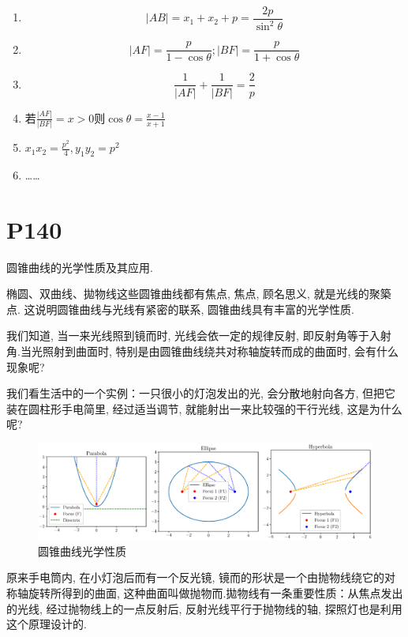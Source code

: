 \documentclass{book}
\begin{document}
    \begin{enumerate}
        \item $$\left| AB \right|=x_1+x_2+p=\frac{2p}{\sin^2\theta}$$
        \item $$\left| AF \right|=\frac{p}{1-\cos \theta};\left| BF \right|=\frac{p}{1+\cos \theta}$$
        \item $$\frac{1}{\left| AF \right|}+\frac{1}{\left| BF \right|}=\frac{2}{p}$$
        \item 若$\displaystyle \frac{\left| AF \right|}{\left| BF \right|}=x>0$则$\displaystyle \cos \theta = \frac{x-1}{x+1}$
        \item $\displaystyle x_1x_2=\frac{p^2}{4},y_1y_2=p^2$
        \item \dots\dots
    \end{enumerate}

    \section{\textcolor[rgb]{0.11,0.65,0.52}{P140}}

    圆锥曲线的光学性质及其应用.

    椭圆、双曲线、拋物线这些圆锥曲线都有焦点, 焦点, 顾名思义, 就是光线的聚築点. 这说明圆锥曲线与光线有紧密的联系, 圆锥曲线具有丰富的光学性质.

    我们知道, 当一来光线照到镜而时, 光线会依一定的规律反射, 即反射角等于入射角.当光照射到曲面时, 特别是由圆锥曲线绕共对称轴旋转而成的曲面时, 会有什么现象呢?

    我们看生活中的一个实例：一只很小的灯泡发出的光, 会分散地射向各方, 但把它装在圆柱形手电简里, 经过适当调节, 就能射出一来比较强的干行光线, 这是为什么呢?

    \begin{figure}[htbp]
        \centering
        \includegraphics[width=\textwidth]{img/ConicCurveLightAttribute.eps}
        \caption{圆锥曲线光学性质}
    \end{figure}

    原来手电筒内, 在小灯泡后而有一个反光镜, 镜而的形状是一个由抛物线绕它的对称轴旋转所得到的曲面, 这种曲面叫做抛物而.拋物线有一条重要性质：从焦点发出的光线, 经过抛物线上的一点反射后, 反射光线平行于抛物线的轴, 探照灯也是利用这个原理设计的.
\end{document}
